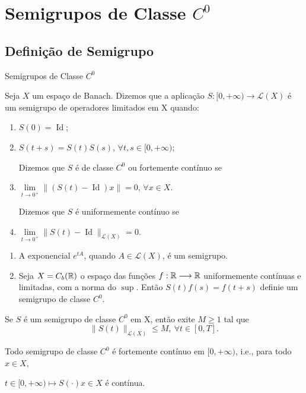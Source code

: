 \section{Semigrupos de Classe $C^0$}


\subsection*{Definição de Semigrupo}
\begin{frame}{Semigrupos de Classe $C^0$}
\begin{defin}
    Seja $X$ um espaço de Banach. Dizemos que a aplicação $S:[0,+\infty)\longrightarrow \mathcal{L}(X)$ é um {\color{blue} semigrupo de operadores limitados em X} quando:
\begin{enumerate}
    \item $S(0)=\operatorname{Id}$;
    \item $S(t+s)=S(t)S(s)$, $\forall t,s\in [0,+\infty)$;

Dizemos que $S$ é {\color{blue} de classe $C^0$ ou fortemente contínuo} se

    \item $\lim\limits_{t\to0^+} \|(S(t)-\operatorname{Id})x\|=0$, $\forall x\in X$.

Dizemos que $S$ é {\color{blue} uniformemente contínuo} se 

\item $\lim\limits_{t\to 0^+}\|S(t)-\operatorname{Id}\|_{\mathcal{L}(X)}=0$.
\end{enumerate}
\end{defin}
\end{frame}

\begin{frame}{}
    \begin{exe}
        \begin{enumerate}
            \item A exponencial $e^{tA}$, quando $A\in \mathcal{L}(X)$, é um semigrupo.
            \item Seja $X=C_b(\mathbb{R})$  o espaço das funções $f:\mathbb{R}\longrightarrow \mathbb{R}$ uniformemente contínuas e limitadas, com a norma do $\sup$. Então $S(t)f(s)=f(t+s)$ definie um semigrupo de classe $C^0$.
        \end{enumerate}
    \end{exe}

\end{frame}

\begin{frame}{}
\begin{prop}
    Se $S$ é um semigrupo de classe $C^0$ em X, então exite $M\geq 1$  tal que
    \[\|S(t)\|_{\mathcal{L}(X)}\leq M,\ \forall t\in [0,T].\]
\end{prop}
\begin{corol}
Todo semigrupo de classe $C^0$ é fortemente contínuo em $[0,+\infty)$, i.e., 
para todo $x\in X$, 
\begin{center}
$t\in [0,+\infty)\longmapsto S(\cdot)x\in  X$ é contínua.
\end{center}
\end{corol}
\end{frame}

